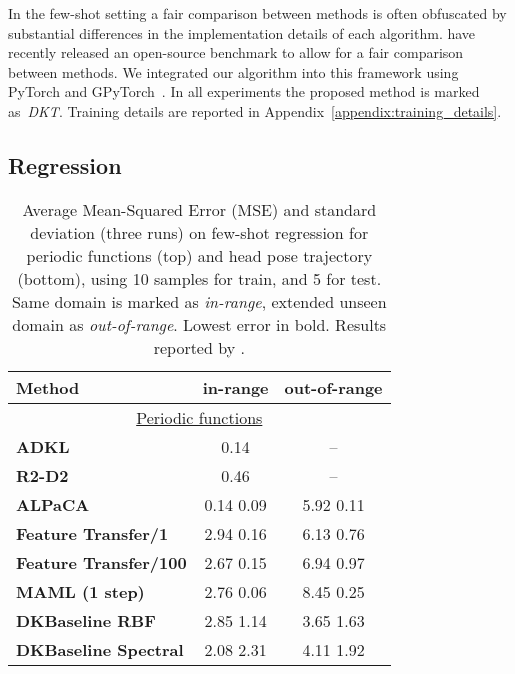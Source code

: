 \documentclass{article}
\begin{document}
In the few-shot setting a fair comparison between methods is often obfuscated by substantial differences in the implementation details of each algorithm. \citet{chen2019closerfewshot} have recently released an open-source benchmark to allow for a fair comparison between methods. We integrated our algorithm into this framework using PyTorch and GPyTorch~\citep{gardner2018gpytorch}. In all experiments the proposed method is marked as~\emph{DKT}. Training details are reported in Appendix~\ref{appendix:training_details}.

\subsection{Regression}\label{ssec:experiments_regression}

\begin{wraptable}{R}{0.45\textwidth}
\caption{Average Mean-Squared Error (MSE) and standard deviation (three runs) on few-shot regression for periodic functions (top) and head pose trajectory (bottom), using 10 samples for train, and 5 for test. Same domain is marked as \emph{in-range}, extended unseen domain as \emph{out-of-range}. Lowest error in bold. Results reported by \cite{tossou2019adaptive}.}
\begin{adjustbox}{width=0.45\columnwidth,center}
\begin{tabular}{lcc}
\hline
\small{\textbf{Method}} & \textbf{in-range} & \textbf{out-of-range}\\ 
\hline
\multicolumn{3}{c}{\small{\underline{Periodic functions}}}\\
\small{\textbf{ADKL}} \citep{tossou2019adaptive} & \small{0.14} & \small{--}\\
\small{\textbf{R2-D2}} \citep{bertinetto2019meta} & \small{0.46} & \small{--}\\
\small{\textbf{ALPaCA}} \citep{harrison2018meta} & \small{0.14  0.09} & \small{5.92  0.11}\\
\small{\textbf{Feature Transfer/1}}
& \small{2.94  0.16} & \small{6.13  0.76}\\
\small{\textbf{Feature Transfer/100}}
& \small{2.67  0.15} & \small{6.94  0.97}\\
\small{\textbf{MAML (1 step)}} & \small{2.76  0.06} & \small{8.45  0.25}\\
\small{\textbf{DKBaseline  RBF}} & \small{2.85  1.14} & \small{3.65  1.63} \\
\small{\textbf{DKBaseline  Spectral}} & \small{2.08  2.31} & \small{4.11  1.92} \\ 

\end{tabular}
\end{adjustbox}
\end{wraptable}
\end{document}
